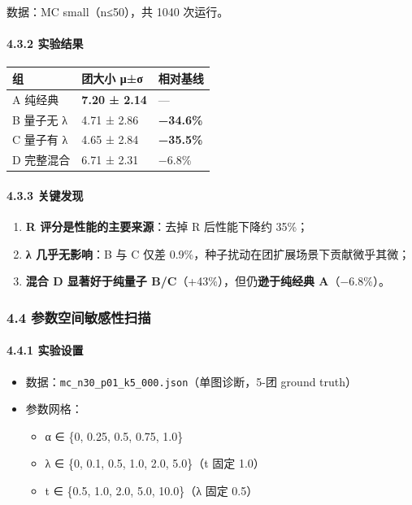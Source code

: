 \documentclass[
  11pt,
]{ctexart}
\newcounter{none} %
\providecommand{\tightlist}{%
  \setlength{\itemsep}{0pt}\setlength{\parskip}{0pt}}
\begin{document}
数据：MC small（n≤50），共 1040 次运行。

\paragraph{4.3.2 实验结果}\label{ux5b9eux9a8cux7ed3ux679c-1}

{\def\LTcaptype{none} %
\begin{longtable}[]{@{}lll@{}}
\toprule\noalign{}
组 & 团大小 μ±σ & 相对基线 \\
\midrule\noalign{}
\endhead
\bottomrule\noalign{}
\endlastfoot
A 纯经典 & \textbf{7.20 ± 2.14} & --- \\
B 量子无 λ & 4.71 ± 2.86 & \textbf{−34.6\%} \\
C 量子有 λ & 4.65 ± 2.84 & \textbf{−35.5\%} \\
D 完整混合 & 6.71 ± 2.31 & −6.8\% \\
\end{longtable}
}

\paragraph{4.3.3 关键发现}\label{ux5173ux952eux53d1ux73b0}

\begin{enumerate}
\def\labelenumi{\arabic{enumi}.}
\tightlist
\item
  \textbf{R 评分是性能的主要来源}：去掉 R 后性能下降约 35\%；
\item
  \textbf{λ 几乎无影响}：B 与 C 仅差
  0.9\%，种子扰动在团扩展场景下贡献微乎其微；
\item
  \textbf{混合 D 显著好于纯量子 B/C}（+43\%），但仍\textbf{逊于纯经典
  A}（−6.8\%）。
\end{enumerate}

\subsubsection{4.4
参数空间敏感性扫描}\label{ux53c2ux6570ux7a7aux95f4ux654fux611fux6027ux626bux63cf}

\paragraph{4.4.1 实验设置}\label{ux5b9eux9a8cux8bbeux7f6e-3}

\begin{itemize}
\tightlist
\item
  数据：\texttt{mc\_n30\_p01\_k5\_000.json}（单图诊断，5-团 ground
  truth）
\item
  参数网格：

  \begin{itemize}
  \tightlist
  \item
    α ∈ \{0, 0.25, 0.5, 0.75, 1.0\}
  \item
    λ ∈ \{0, 0.1, 0.5, 1.0, 2.0, 5.0\}（t 固定 1.0）
  \item
    t ∈ \{0.5, 1.0, 2.0, 5.0, 10.0\}（λ 固定 0.5）
  \end{itemize}
\end{itemize}
\end{document}
